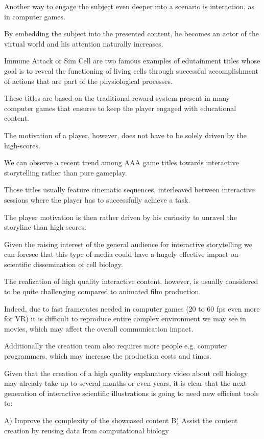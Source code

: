 Another way to engage the subject even deeper into a scenario is interaction, as in computer games.

By embedding the subject into the presented content, he becomes an actor of the virtual world and his attention naturally increases. 

Immune Attack or Sim Cell are two famous examples of edutainment titles whose goal is to reveal the functioning of living cells through successful accomplishment of actions that are part of the physiological processes.

These titles are based on the traditional reward system present in many computer games that ensures to keep the player engaged with educational content.

The motivation of a player, however, does not have to be solely driven by the high-scores.

We can observe a recent trend among AAA game titles towards interactive storytelling rather than pure gameplay.

Those titles usually feature cinematic sequences, interleaved between interactive sessions where the player has to successfully achieve a task.

The player motivation is then rather driven by his curiosity to unravel the storyline than high-scores.

Given the raising interest of the general audience for interactive storytelling we can foresee that this type of media could have a hugely effective impact on scientific dissemination of cell biology.

The realization of high quality interactive content, however, is usually considered to be quite challenging compared to animated film production.

Indeed, due to fast framerates needed in computer games (20 to 60 fps even more for VR) it is difficult to reproduce entire complex environment we may see in movies, which may affect the overall communication impact. 

Additionally the creation team also requires more people e.g. computer programmers, which may increase the production costs and times. 

Given that the creation of a high quality explanatory video about cell biology may already take up to several months or even years, it is clear that the next generation of interactive scientific illustrations is going to need new efficient tools to:

A) Improve the complexity of the showcased content
B) Assist the content creation by reusing data from computational biology

